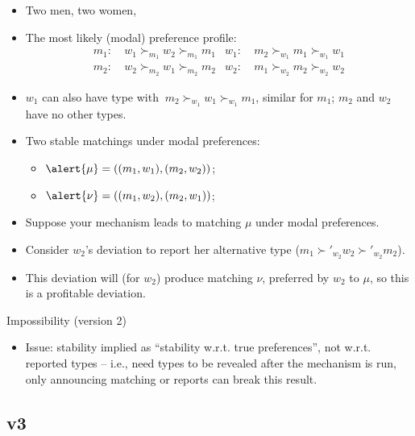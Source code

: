 \documentclass[english,10pt
,aspectratio=169
]{beamer}
\begin{document}
\begin{frame}
\begin{example}
	\begin{itemize}
		\item Two men, two women, 
		\item The most likely (modal) preference profile:
		{\footnotesize 
			\begin{align*}
				m_1:& \ w_1 \succ_{m_1} w_2 \succ_{m_1} m_1 	& w_1:& \ m_2 \succ_{w_1} m_1 \succ_{w_1} w_1
				\\
				m_2:& \ w_2 \succ_{m_2} w_1 \succ_{m_2} m_2 	& w_2:& \ m_1 \succ_{w_2} m_2 \succ_{w_2} w_2
			\end{align*}
		}
		\item $w_1$ can also have type with $\ m_2 \succ_{w_1} w_1 \succ_{w_1} m_1$, similar for $m_1$; $m_2$ and $w_2$ have no other types.
		\item Two stable matchings under modal preferences: 
		\begin{itemize}
			\item $\alert{\mu} = \left( (m_1,w_1), (m_2,w_2)  \right)$;
			\item $\alert{\nu} = \left( (m_1,w_2), (m_2,w_1)  \right)$;
		\end{itemize}
		\item Suppose your mechanism leads to matching $\mu$ under modal preferences.
		\item Consider $w_2$'s deviation to report her alternative type ($m_1 \succ'_{w_2} w_2 \succ'_{w_2} m_2$).
		\item This deviation will  (for $w_2$) produce matching $\nu$, preferred by $w_2$ to $\mu$, so this is a profitable deviation.
	\end{itemize}
\end{example}
\end{frame}


\begin{frame}{Impossibility (version 2)}
\begin{itemize}
	\item \alert{Issue}: stability implied as ``stability w.r.t. true preferences'', not w.r.t. reported types -- i.e., need types to be revealed after the mechanism is run, only announcing matching or reports can break this result.
\end{itemize}
\end{frame}


\subsection{v3}
\end{document}
